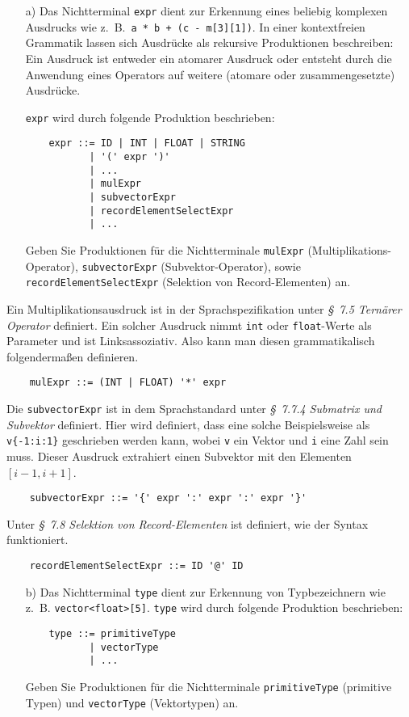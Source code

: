 \documentclass[
  ngerman,
  DIV=14
]{scrartcl}
\begin{document}
\begin{enumerate}
\item[a)]
Das Nichtterminal \verb|expr| dient zur Erkennung eines beliebig komplexen Ausdrucks wie z.~B.\ \verb|a * b + (c - m[3][1])|. In einer kontextfreien Grammatik lassen sich Ausdrücke als rekursive Produktionen beschreiben: Ein Ausdruck ist entweder ein atomarer Ausdruck oder entsteht durch die Anwendung eines Operators auf weitere (atomare oder zusammengesetzte) Ausdrücke.

\verb|expr| wird durch folgende Produktion beschrieben:
\begin{verbatim}
    expr ::= ID | INT | FLOAT | STRING
           | '(' expr ')'
           | ...
           | mulExpr
           | subvectorExpr
           | recordElementSelectExpr
           | ...
\end{verbatim}

Geben Sie Produktionen für die Nichtterminale \texttt{mulExpr} (Multiplikations-Operator), \texttt{subvectorExpr} (Subvektor-Operator), sowie \texttt{recordElementSelectExpr} (Selektion von Record-Elementen) an.
\end{enumerate}
Ein Multiplikationsausdruck ist in der Sprachspezifikation unter \emph{§~7.5 Ternärer Operator} definiert. Ein solcher Ausdruck nimmt \verb|int| oder \verb|float|-Werte als Parameter und ist Linksassoziativ. Also kann man diesen grammatikalisch folgendermaßen definieren.
\begin{verbatim}
    mulExpr ::= (INT | FLOAT) '*' expr
\end{verbatim}
Die \verb|subvectorExpr| ist in dem Sprachstandard unter \emph{§~7.7.4 Submatrix und Subvektor} definiert. Hier wird definiert, dass eine solche Beispielsweise als \verb|v{-1:i:1}| geschrieben werden kann, wobei \verb|v| ein Vektor und \verb|i| eine Zahl sein muss. Dieser Ausdruck extrahiert einen Subvektor mit den Elementen $[i-1, i+1]$. 
\begin{verbatim}
    subvectorExpr ::= '{' expr ':' expr ':' expr '}'  
\end{verbatim}
Unter \emph{§~7.8 Selektion von Record-Elementen} ist definiert, wie der Syntax funktioniert.
\begin{verbatim}
    recordElementSelectExpr ::= ID '@' ID  
\end{verbatim}
\begin{enumerate}
\item[b)]
Das Nichtterminal \texttt{type} dient zur Erkennung von Typbezeichnern wie z.~B. \texttt{vector<float>[5]}. \texttt{type} wird durch folgende Produktion beschrieben:
\begin{verbatim}
    type ::= primitiveType
           | vectorType
           | ...
\end{verbatim}
Geben Sie Produktionen für die Nichtterminale \verb|primitiveType| (primitive Typen) und \verb|vectorType| (Vektortypen) an.
\end{enumerate}
\end{document}
